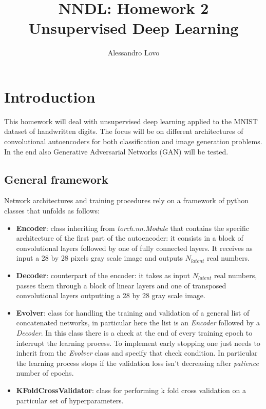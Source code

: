 \documentclass[a4paper, 11pt]{article}
\begin{document}
\title{NNDL: Homework 2 \\ Unsupervised Deep Learning}
\author{Alessandro Lovo}
\maketitle

\section{Introduction}
  This homework will deal with unsupervised deep learning applied to the MNIST dataset of handwritten digits. The focus will be on different architectures of convolutional autoencoders for both classification and image generation problems. In the end also Generative Adversarial Networks (GAN) will be tested.

  \subsection{General framework}
  Network architectures and training procedures rely on a framework of python classes that unfolds as follows:
  \begin{itemize}
    \item \textbf{Encoder}: class inheriting from \emph{torch.nn.Module} that contains the specific architecture of the first part of the autoencoder: it consists in a block of convolutional layers followed by one of fully connected layers. It receives as input a 28 by 28 pixels gray scale image and outputs $N_{latent}$ real numbers.
    \item \textbf{Decoder}: counterpart of the encoder: it takes as input $N_{latent}$ real numbers, passes them through a block of linear layers and one of transposed convolutional layers outputting a 28 by 28 gray scale image.
    \item \textbf{Evolver}: class for handling the training and validation of a general list of concatenated networks, in particular here the list is an \emph{Encoder} followed by a \emph{Decoder}. In this class there is a check at the end of every training epoch to interrupt the learning process. To implement early stopping one just needs to inherit from the \emph{Evolver} class and specify that check condition. In particular the learning process stops if the validation loss isn't decreasing after \emph{patience} number of epochs.
    \item \textbf{KFoldCrossValidator}: class for performing k fold cross validation on a particular set of hyperparameters.
  \end{itemize}
\end{document}
